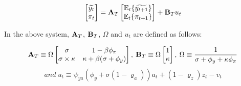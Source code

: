 \documentclass[12pt]{article}
\newcommand{\1}{\mathbbm 1}
\renewcommand{\rho}{\varrho}
\begin{document}
	\begin{equation}
		\begin{bmatrix}
			\widetilde{y_{t}}  \\
			\pi_{t} \\
		\end{bmatrix} = {\bf{A}}_{T} \begin{bmatrix}
		\mathbb{E}_{t}\{\widetilde{y_{t+1}}\}  \\
		\mathbb{E}_{t}\{{\pi_{t+1}}\} \end{bmatrix} + {\bf{B}}_{T} u_{t} \\
	\end{equation}


In the above system, ${\bf{A}}_{T}$, ${\bf{B}}_{T}$, $\Omega$ and $u_{t}$ are defined as follows:

	\begin{equation*}
		{\bf{A}}_{T} \equiv \Omega 
		\begin{bmatrix}
			\sigma & 1 - \beta \phi_{\pi}  \\
			\sigma \times \kappa & \kappa + \beta (\sigma + \phi_{y}) \\
		\end{bmatrix}, \:
		{\bf{B}}_{T} \equiv \Omega \begin{bmatrix}
			1 \\
			\kappa \\
		\end{bmatrix}, \: \Omega \equiv \frac{1}{\sigma + \phi_{y} + \kappa \phi_{\pi}}
	\end{equation*}
\begin{equation*}
and \: u_{t} \equiv \psi_{ya}(\phi_{y} + \sigma (1 - \rho_{a}))a_{t} + (1 - \rho_{z})z_{t} - v_{t}
\end{equation*}
\end{document}
